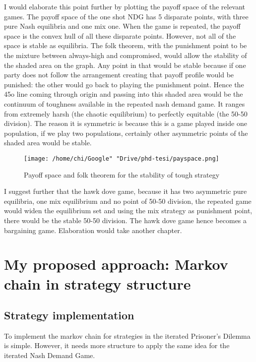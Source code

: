 \documentclass[12.5pt]{report}
\begin{document}
I would elaborate this point further by plotting the payoff space of the relevant games. The payoff space of the one shot NDG has 5 disparate points, with three pure Nash equilibria and one mix one. When the game is repeated, the payoff space is the convex hull of all these disparate points. However, not all of the space is stable as equilibria. The folk theorem, with the punishment point to be the mixture between always-high and compromised, would allow the stability of the shaded area on the graph. Any point in that would be stable because if one party does not follow the arrangement creating that payoff profile would be punished: the other would go back to playing the punishment point. Hence the 45o line coming through origin and passing into this shaded area would be the continuum of toughness available in the repeated nash demand game. It ranges from extremely harsh (the chaotic equilibrium) to perfectly equitable (the 50-50 division). The reason it is symmetric is because this is a game played inside one population, if we play two populations, certainly other asymmetric points of the shaded area would be stable.

\begin{figure}[h!]
\texttt{[image: /home/chi/Google" "Drive/phd-tesi/payspace.png]}
\caption{Payoff space and folk theorem for the stability of tough strategy}
\end{figure}

I suggest further that the hawk dove game, because it has two asymmetric pure equilibria, one mix equilibrium and no point of 50-50 division, the repeated game would widen the equilibrium set and using the mix strategy as punishment point, there would be the stable 50-50 division. The hawk dove game hence becomes a bargaining game. Elaboration would take another chapter.\\

\chapter{My proposed approach: Markov chain in strategy structure}

\section{Strategy implementation}

To implement the markov chain for strategies in the iterated Prisoner's Dilemma is simple. However, it needs more structure to apply the same idea for the iterated Nash Demand Game.
\end{document}
